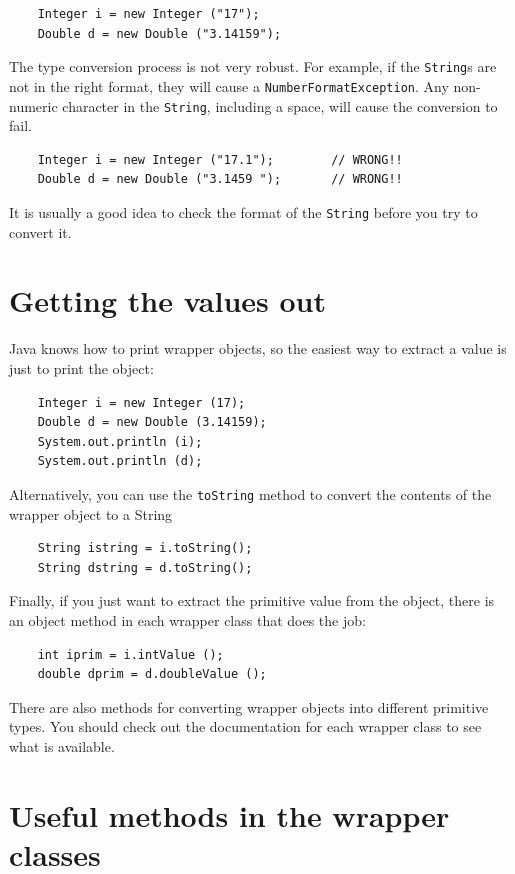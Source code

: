 \documentclass[12pt]{book}
\theoremstyle{exercise}
\begin{document}
\begin{verbatim}
    Integer i = new Integer ("17");
    Double d = new Double ("3.14159");
\end{verbatim}
%
The type conversion process is not very robust.
For example, if the {\tt String}s are not in the right format,
they will cause a {\tt NumberFormatException}.  Any non-numeric
character in the {\tt String}, including a space, will cause
the conversion to fail.


\begin{verbatim}
    Integer i = new Integer ("17.1");        // WRONG!!
    Double d = new Double ("3.1459 ");       // WRONG!!
\end{verbatim}
%
It is usually a good idea to check the format of the {\tt String}
before you try to convert it.


\section{Getting the values out}

Java knows how to print wrapper objects, so the easiest
way to extract a value is just to print the object:

\begin{verbatim}
    Integer i = new Integer (17);
    Double d = new Double (3.14159);
    System.out.println (i);
    System.out.println (d);
\end{verbatim}
%
Alternatively, you can use the {\tt toString} method to
convert the contents of the wrapper object to a String

\begin{verbatim}
    String istring = i.toString();
    String dstring = d.toString();
\end{verbatim}
%
Finally, if you just want to extract the primitive value
from the object, there is an object method in each wrapper
class that does the job:

\begin{verbatim}
    int iprim = i.intValue ();
    double dprim = d.doubleValue ();
\end{verbatim}
%
There are also methods for converting wrapper objects into
different primitive types.  You should check out the documentation
for each wrapper class to see what is available.


\section{Useful methods in the wrapper classes}
\end{document}
